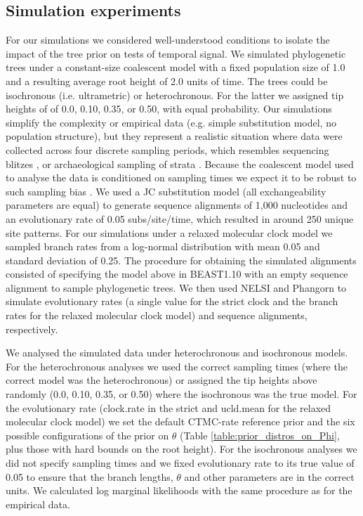 \documentclass[10pt,letterpaper]{article}
\begin{document}
\subsection*{Simulation experiments}
For our simulations we considered well-understood conditions to isolate the impact of the tree prior on tests of temporal signal. We simulated phylogenetic trees under a constant-size coalescent model with a fixed population size of 1.0 and a resulting average root height of 2.0 units of time. The trees could be isochronous (i.e. ultrametric) or heterochronous. For the latter we assigned tip heights of of 0.0, 0.10, 0.35, or 0.50, with equal probability. {Our simulations simplify the complexity or empirical data (e.g. simple substitution model, no population structure), but they represent a realistic situation where data were collected across four discrete sampling periods, which resembles sequencing blitzes \cite{porter2022new}, or archaeological sampling of strata \cite{zhang2016total}}. Because the coalescent model used to analyse the data is conditioned on sampling times we expect it to be robust to such sampling bias \cite{stadler2015well, volz2014sampling, featherstone2021infectious}. We used a JC substitution model \cite{jukes1969evolution} {(all exchangeability parameters are equal)} to generate sequence alignments of 1,000 nucleotides and an evolutionary rate of 0.05 subs/site/time, which resulted in around 250 unique site patterns. For our simulations under a relaxed molecular clock model we sampled branch rates from a log-normal distribution with mean 0.05 and standard deviation of 0.25. The procedure for obtaining the simulated alignments consisted of specifying the model above in BEAST1.10 with an empty sequence alignment to sample phylogenetic trees. We then used NELSI \cite{ho2015simulating} and Phangorn \cite{schliep2011phangorn} to simulate evolutionary rates (a single value for the strict clock and the branch rates for the relaxed molecular clock model) and sequence alignments, respectively.

We analysed the simulated data under heterochronous and isochronous models. For the heterochronous analyses we used the correct sampling times (where the correct model was the heterochronous) or assigned the tip heights above randomly (0.0, 0.10, 0.35, or 0.50) where the isochronous was the true model. For the evolutionary rate (clock.rate in the strict and ucld.mean for the relaxed molecular clock model) we set the default CTMC-rate reference prior and the six possible configurations of the prior on $\theta$ (Table \ref{table:prior_distros_on_Phi}, plus those with hard bounds on the root height). For the isochronous analyses we did not specify sampling times and we fixed evolutionary rate to its true value of 0.05 to ensure that the branch lengths, $\theta$ and other parameters are in the correct units. We calculated log marginal likelihoods with the same procedure as for the empirical data.
\end{document}
